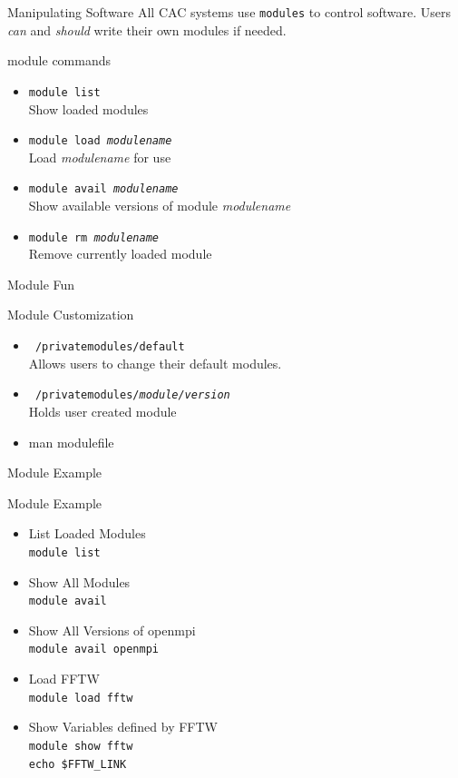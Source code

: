 \documentclass{beamer}
\begin{document}
\begin{frame}{Manipulating Software}
  All CAC systems use \texttt{modules} to control software. Users \textit{can} and \textit{should} write their own modules if needed.
  \begin{block}{module commands}
  \begin{itemize}
    \item \texttt{module list} \\ Show loaded modules
    \item \texttt{module load \textit{modulename}} \\  Load \textit{modulename} for use
    \item \texttt{module avail \textit{modulename}} \\ Show available versions of module \textit{modulename}
    \item \texttt{module rm \textit{modulename}} \\  Remove currently loaded module
  \end{itemize}
  \end{block}
\end{frame}
\begin{frame}{Module Fun}
  \begin{block}{Module Customization}
  \begin{itemize}
  \item \texttt{~/privatemodules/default}
   \\    Allows users to change their default modules.
  \item \texttt{~/privatemodules/\textit{module/version}}
   \\    Holds user created module
  \item man modulefile
  \end{itemize}
  \end{block}
\end{frame}
\begin{frame}{Module Example}
 \begin{block}{Module Example}
  \begin{itemize}
    \item<1-> List Loaded Modules
         \\ \texttt{module list}
    \item<2-> Show All Modules
         \\ \texttt{module avail}
    \item<3-> Show All Versions of openmpi
         \\ \texttt{module avail openmpi}
    \item<4-> Load FFTW
         \\ \texttt{module load fftw}
    \item<5-> Show Variables defined by FFTW 
         \\ \texttt{module show fftw}
         \\ \texttt{echo \$FFTW\_LINK}
  \end{itemize}
 \end{block}
\end{frame}
 
\end{document}
